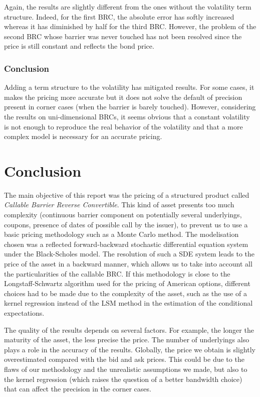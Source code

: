 \documentclass[a4paper,11pt,english]{book}
\begin{document}
\newpage
Again, the results are slightly different from the ones without the volatility term structure. Indeed, for the first BRC, the absolute error has softly increased whereas it has diminished by half for the third BRC. However, the problem of the second BRC whose barrier was never touched has not been resolved since the price is still constant and reflects the bond price.

\subsection{Conclusion}
Adding a term structure to the volatility has mitigated results. For some cases, it makes the pricing more accurate but it does not solve the default of precision present in corner cases (when the barrier is barely touched). However, considering the results on uni-dimensional BRCs, it seems obvious that a constant volatility is not enough to reproduce the real behavior of the volatility and that a more complex model is necessary for an accurate pricing. 

\backmatter
\chapter*{Conclusion}
The main objective of this report was the pricing of a structured product called \textit{Callable Barrier Reverse Convertible}. This kind of asset presents too much complexity (continuous barrier component on potentially several underlyings, coupons, presence of dates of possible call by the issuer), to prevent us to use a basic pricing methodology such as a Monte Carlo method. The modelisation chosen was a reflected forward-backward stochastic differential equation system under the Black-Scholes model. The resolution of such a SDE system leads to the price of the asset in a backward manner, which allows us to take into account all the particularities of the callable BRC. If this methodology is close to the Longstaff-Schwartz algorithm used for the pricing of American options, different choices had to be made due to the complexity of the asset, such as the use of a kernel regression instead of the LSM method in the estimation of the conditional expectations.

The quality of the results depends on several factors. For example, the longer the maturity of the asset, the less precise the price. The number of underlyings also plays a role in the accuracy of the results. Globally, the price we obtain is slightly overestimated compared with the bid and ask prices. This could be due to the flaws of our methodology and the unrealistic assumptions we made, but also to the kernel regression (which raises the question of a better bandwidth choice) that can affect the precision in the corner cases.
\end{document}
